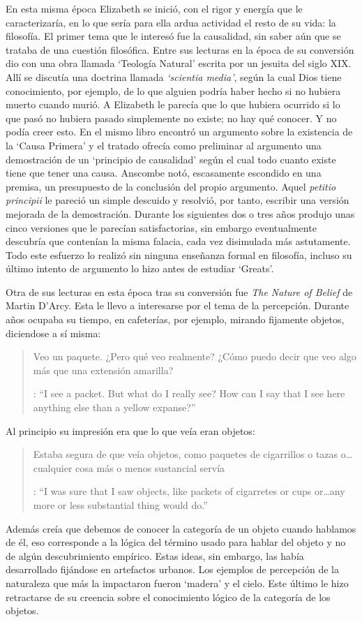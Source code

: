 En esta misma época Elizabeth se inició, con el rigor y energía que le caracterizaría, en lo que sería para ella ardua actividad el resto de su vida: la filosofía. El primer tema que le interesó fue la causalidad, sin saber aún que se trataba de una cuestión filosófica. Entre sus lecturas en la época de su conversión dio con una obra llamada `Teología Natural' escrita por un jesuita del siglo XIX. Allí se discutía una doctrina llamada \emph{`scientia media'}, según la cual Dios tiene conocimiento, por ejemplo, de lo que alguien podría haber hecho si no hubiera muerto cuando murió. A Elizabeth le parecía que lo que hubiera ocurrido si lo que pasó no hubiera pasado simplemente no existe; no hay qué conocer. Y no podía creer esto. En el mismo libro encontró un argumento sobre la existencia de la `Causa Primera' y el tratado ofrecía como preliminar al argumento una demostración de un `principio de causalidad' según el cual todo cuanto existe tiene que tener una causa. Anscombe notó, escasamente escondido en una premisa, un presupuesto de la conclusión del propio argumento. Aquel \emph{petitio principii} le pareció un simple descuido y resolvió, por tanto, escribir una versión mejorada de la demostración. Durante los siguientes dos o tres años produjo unas cinco versiones que le parecían satisfactorias, sin embargo eventualmente descubría que contenían la misma falacia, cada vez disimulada más astutamente. Todo este esfuerzo lo realizó sin ninguna enseñanza formal en filosofía, incluso su último intento de argumento lo hizo antes de estudiar `Greats'\autocite[Cf.~][vii]{anscombe1981metaphysics}.

Otra de sus lecturas en esta época tras su conversión fue \emph{The Nature of Belief} de Martin D'Arcy. Esta le llevo a interesarse por el tema de la percepción. Durante años ocupaba su tiempo, en cafeterías, por ejemplo, mirando fijamente objetos, diciendose a sí misma: \blockquote[{\cite[viii]{anscombe1981metaphysics}}: \enquote{I see a packet. But what do I really see? How can I say that I see here anything else than a yellow expanse?}]{Veo un paquete. ¿Pero qué veo realmente? ¿Cómo puedo decir que veo algo más que una extensión amarilla?} Al principio su impresión era que lo que veía eran objetos: \blockquote[{\cite[viii]{anscombe1981metaphysics}}: \enquote{I was sure that I saw objects, like packets of cigarretes or cups or\ldots any more or less substantial thing would do.}]{Estaba segura de que veía objetos, como paquetes de cigarrillos o tazas o\ldots cualquier cosa más o menos sustancial servía}. Además creía que debemos de conocer la categoría de un objeto cuando hablamos de él, eso corresponde a la lógica del término usado para hablar del objeto y no de algún descubrimiento empírico. Estas ideas, sin embargo, las había desarrollado fijándose en artefactos urbanos. Los ejemplos de percepción de la naturaleza que más la impactaron fueron `madera' y el cielo. Este último le hizo retractarse de su creencia sobre el conocimiento lógico de la categoría de los objetos\autocite[Cf.~][viii]{anscombe1981metaphysics}.

